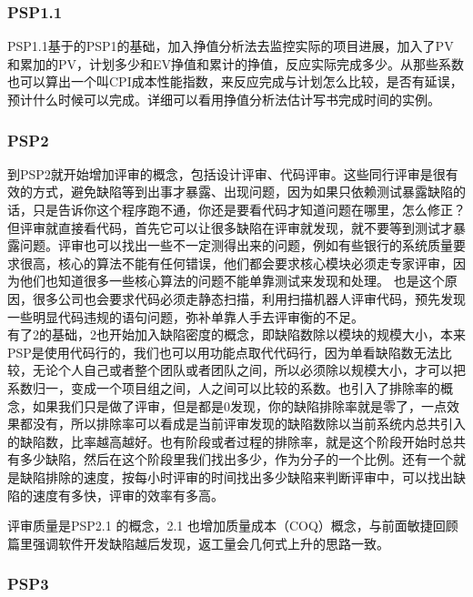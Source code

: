 \hypertarget{psp1.1}{%
\subsubsection{PSP1.1}\label{psp1.1}}

PSP1.1基于的PSP1的基础，加入挣值分析法去监控实际的项目进展，加入了PV和累加的PV，计划多少和EV挣值和累计的挣值，反应实际完成多少。从那些系数也可以算出一个叫CPI成本性能指数，来反应完成与计划怎么比较，是否有延误，预计什么时候可以完成。详细可以看用挣值分析法估计写书完成时间的实例。

\hypertarget{psp2}{%
\subsubsection{PSP2}\label{psp2}}

到PSP2就开始增加评审的概念，包括设计评审、代码评审。这些同行评审是很有效的方式，避免缺陷等到出事才暴露、出现问题，因为如果只依赖测试暴露缺陷的话，只是告诉你这个程序跑不通，你还是要看代码才知道问题在哪里，怎么修正？但评审就直接看代码，首先它可以让很多缺陷在评审就发现，就不要等到测试才暴露问题。评审也可以找出一些不一定测得出来的问题，例如有些银行的系统质量要求很高，核心的算法不能有任何错误，他们都会要求核心模块必须走专家评审，因为他们也知道很多一些核心算法的问题不能单靠测试来发现和处理。
也是这个原因，很多公司也会要求代码必须走静态扫描，利用扫描机器人评审代码，预先发现一些明显代码违规的语句问题，弥补单靠人手去评审衡的不足。\\
有了2的基础，2也开始加入缺陷密度的概念，即缺陷数除以模块的规模大小，本来PSP是使用代码行的，我们也可以用功能点取代代码行，因为单看缺陷数无法比较，无论个人自己或者整个团队或者团队之间，所以必须除以规模大小，才可以把系数归一，变成一个项目组之间，人之间可以比较的系数。也引入了排除率的概念，如果我们只是做了评审，但是都是0发现，你的缺陷排除率就是零了，一点效果都没有，所以排除率可以看成是当前评审发现的缺陷数除以当前系统内总共引入的缺陷数，比率越高越好。也有阶段或者过程的排除率，就是这个阶段开始时总共有多少缺陷，然后在这个阶段里我们找出多少，作为分子的一个比例。还有一个就是缺陷排除的速度，按每小时评审的时间找出多少缺陷来判断评审中，可以找出缺陷的速度有多快，评审的效率有多高。

评审质量是PSP2.1 的概念，2.1
也增加质量成本（COQ）概念，与前面敏捷回顾篇里强调软件开发缺陷越后发现，返工量会几何式上升的思路一致。

\hypertarget{psp3}{%
\subsubsection{PSP3}\label{psp3}}

